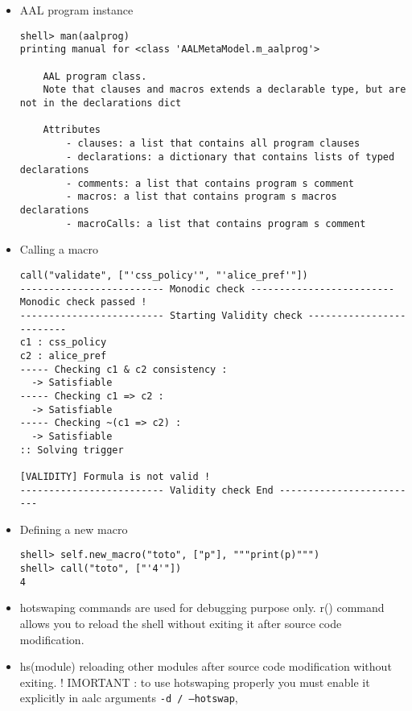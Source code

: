 {\begin{itemize}
\begin{lstlisting}
\end{lstlisting}

    \item AAL program instance
\begin{lstlisting}
shell> man(aalprog)
printing manual for <class 'AALMetaModel.m_aalprog'>

    AAL program class.
    Note that clauses and macros extends a declarable type, but are not in the declarations dict

    Attributes
        - clauses: a list that contains all program clauses
        - declarations: a dictionary that contains lists of typed declarations
        - comments: a list that contains program s comment
        - macros: a list that contains program s macros declarations
        - macroCalls: a list that contains program s comment
\end{lstlisting}

    \item Calling a macro
\begin{lstlisting}
call("validate", ["'css_policy'", "'alice_pref'"])
------------------------- Monodic check -------------------------
Monodic check passed !
------------------------- Starting Validity check -------------------------
c1 : css_policy
c2 : alice_pref
----- Checking c1 & c2 consistency :
  -> Satisfiable
----- Checking c1 => c2 :
  -> Satisfiable
----- Checking ~(c1 => c2) :
  -> Satisfiable
:: Solving trigger

[VALIDITY] Formula is not valid !
------------------------- Validity check End -------------------------
\end{lstlisting}

    \item Defining a new macro
\begin{lstlisting}
shell> self.new_macro("toto", ["p"], """print(p)""")
shell> call("toto", ["'4'"])
4
\end{lstlisting}


  \item hotswaping commands are used for debugging purpose only.
  r() command allows you to reload the shell without exiting it after source code modification.

  \item hs(module) reloading other modules after source code modification without exiting.
  ! IMORTANT : to use hotswaping properly you must enable it explicitly in aalc arguments
  \texttt{-d / --hotswap},

\end{itemize}
}
